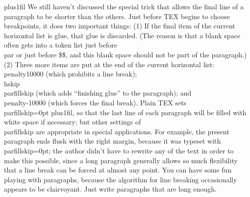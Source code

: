 \parfillskip=0pt plus1fil
We still haven’t discussed the special trick that allows the final line of a
paragraph to be shorter than the others.
Just before TEX begins to choose
breakpoints, it does two important things: (1) If the final item of the current horizontal
list is glue, that glue is discarded. 
(The reason is that a blank space often gets into a
token list just before \\par or just before \$\$, 
and this blank space should not be part
of the paragraph.) 
(2) Three more items are put at the end of the current horizontal
list: \\{penalty10000} (which prohibits a line break); \\{hskip\\parfillskip} (which adds
“finishing glue” to the paragraph);
and \\penalty-10000 (which forces the final break).
Plain TEX sets \\parfillskip=0pt plus1fil,
so that the last line of each paragraph will
be filled with white space if necessary;
but other settings of \\parfillskip are appropriate in special applications.
For example, the present paragraph ends flush with the
right margin, because it was typeset with \\parfillskip=0pt; the author didn’t have to
rewrite any of the text in order to make this possible, since a long paragraph generally
allows so much flexibility that a line break can be forced at almost any point. You
can have some fun playing with paragraphs, because the algorithm for line breaking
occasionally appears to be clairvoyant. Just write paragraphs that are long enough.
\parskip=3pt
\parindent=20pt


